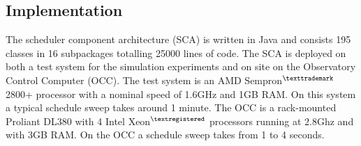 \subsection{Implementation}
The scheduler component architecture (SCA) is written in Java and consists 195 classes in 16 subpackages totalling 25000 lines of code. The SCA is deployed on both a test system for the simulation experiments and on site on the Observatory Control Computer (OCC). The test system is an AMD Sempron$^{\texttrademark}$ 2800+ processor with a nominal speed of 1.6GHz and 1GB RAM. On this system a typical schedule sweep takes around 1 minute. The OCC is a rack-mounted Proliant DL380 with 4 Intel Xeon$^{\textregistered}$ processors running at 2.8Ghz and with 3GB RAM. On the OCC a schedule sweep takes from 1 to 4 seconds.

